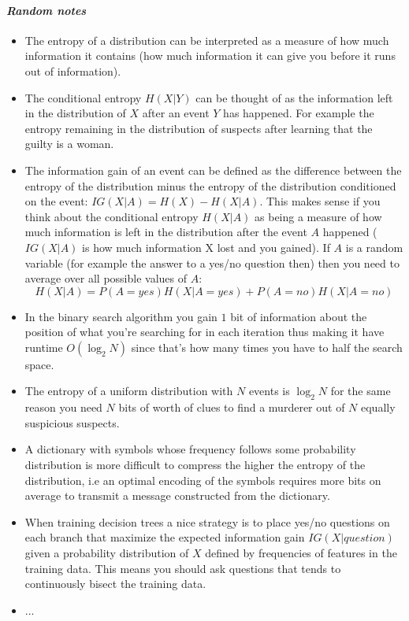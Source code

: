 \paragraph{\textit{Random notes}}
\begin{itemize}
    \item The entropy of a distribution can be interpreted as a measure of how much information it contains (how much information it can give you before it runs out of information).
    \item
        The conditional entropy $H(X|Y)$ can be thought of as the information left in the distribution of $X$ after an event $Y$ has happened. For example the entropy remaining in the distribution of suspects after learning that the guilty is a woman.
    \item
        The information gain of an event can be defined as the difference between the entropy of the distribution minus the entropy of the distribution conditioned on the event: $IG(X|A) = H(X) - H(X|A)$. This makes sense if you think about the conditional entropy $H(X|A)$ as being a measure of how much information is left in the distribution after the event $A$ happened ($IG(X|A)$ is how much information X lost and you gained). If $A$ is a random variable (for example the answer to a yes/no question then) then you need to average over all possible values of $A$: $$H(X|A) = P(A=yes)H(X|A=yes) + P(A=no)H(X|A=no)$$
    \item
        In the binary search algorithm you gain $1$ bit of information about the position of what you're searching for in each iteration thus making it have runtime $O(\log_2{N})$ since that's how many times you have to half the search space.
    \item
        The entropy of a uniform distribution with $N$ events is $\log_2{N}$ for the same reason you need $N$ bits of worth of clues to find a murderer out of $N$ equally suspicious suspects.
    \item
        A dictionary with symbols whose frequency follows some probability distribution is more difficult to compress the higher the entropy of the distribution, i.e an optimal encoding of the symbols requires more bits on average to transmit a message constructed from the dictionary.
    \item
        When training decision trees a nice strategy is to place yes/no questions on each branch that maximize the expected information gain $IG(X|question)$ given a probability distribution of $X$ defined by frequencies of features in the training data. This means you should ask questions that tends to continuously bisect the training data.
    \item ...
\end{itemize}


